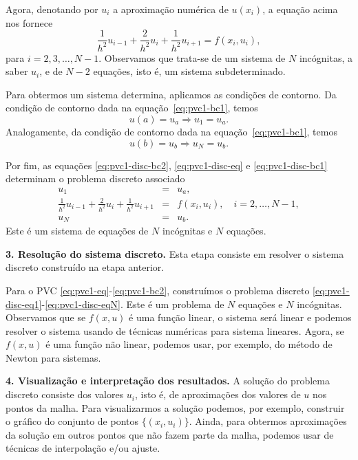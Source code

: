 Agora, denotando por $u_i$ a aproximação numérica de $u(x_i)$, a equação acima nos fornece
\begin{equation}\label{eq:pvc1-disc-eq}
\frac{1}{h^2}u_{i-1} + \frac{2}{h^2}u_i + \frac{1}{h^2}u_{i+1} = f(x_i, u_i),
\end{equation}
para $i=2, 3, \dotsc, N-1$. Observamos que trata-se de um sistema de $N$ incógnitas, a saber $u_i$, e de $N-2$ equações, isto é, um sistema subdeterminado.

Para obtermos um sistema determina, aplicamos as condições de contorno. Da condição de contorno dada na equação~\eqref{eq:pvc1-bc1}, temos
\begin{equation}\label{eq:pvc1-disc-bc1}
  u(a) = u_a\Rightarrow u_1 = u_a.
\end{equation}
Analogamente, da condição de contorno dada na equação~\eqref{eq:pvc1-bc1}, temos
\begin{equation}\label{eq:pvc1-disc-bc2}
  u(b) = u_b\Rightarrow u_N = u_b.
\end{equation}

Por fim, as equações \eqref{eq:pvc1-disc-bc2}, \eqref{eq:pvc1-disc-eq} e \eqref{eq:pvc1-disc-bc1} determinam o problema discreto associado
\begin{eqnarray}
  u_1 &=& u_a,\label{eq:pvc1-disc-eq1}\\
  \frac{1}{h^2}u_{i-1} + \frac{2}{h^2}u_i + \frac{1}{h^2}u_{i+1} &=& f(x_i, u_i),\quad i=2, \dotsc, N-1,\label{eq:pvc1-disc-eqi}\\
  u_N &=& u_b.\label{eq:pvc1-disc-eqN}
\end{eqnarray}
Este é um sistema de equações de $N$ incógnitas e $N$ equações.

{\bf 3. Resolução do sistema discreto.} Esta etapa consiste em resolver o sistema discreto construído na etapa anterior. 

Para o PVC \eqref{eq:pvc1-eq}-\eqref{eq:pvc1-bc2}, construímos o problema discreto \eqref{eq:pvc1-disc-eq1}-\eqref{eq:pvc1-disc-eqN}. Este é um problema de $N$ equações e $N$ incógnitas. Observamos que se $f(x, u)$ é uma função linear, o sistema será linear e podemos resolver o sistema usando de técnicas numéricas para sistema lineares. Agora, se $f(x, u)$ é uma função não linear, podemos usar, por exemplo, do método de Newton para sistemas.

{\bf 4. Visualização e interpretação dos resultados.} A solução do problema discreto consiste dos valores $u_i$, isto é, de aproximações dos valores de $u$ nos pontos da malha. Para visualizarmos a solução podemos, por exemplo, construir o gráfico do conjunto de pontos $\{(x_i, u_i)\}$. Ainda, para obtermos aproximações da solução em outros pontos que não fazem parte da malha, podemos usar de técnicas de interpolação e/ou ajuste.

